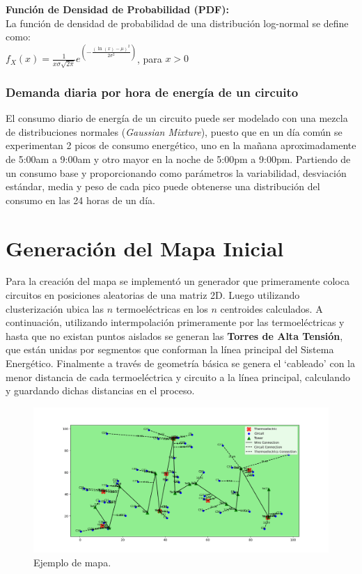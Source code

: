 \documentclass[twocolumn, fontsize=10pt]{article}
\begin{document}
\textbf{Función de Densidad de Probabilidad (PDF):}\\
La función de densidad de probabilidad de una distribución log-normal se define como:\\
$ f_X(x) = \frac{1}{x \sigma \sqrt{2 \pi}} e^{\left(-\frac{(\ln(x) - \mu)^2}{2 \sigma^2}\right)} $,  para $x > 0$

\subsubsection{Demanda diaria por hora de energía de un circuito}
El consumo diario de energía de un circuito puede ser modelado con una mezcla de distribuciones 
normales (\textit{Gaussian Mixture}), puesto que en un día común se experimentan 2 picos de consumo 
energético, uno en la mañana aproximadamente de 5:00am a 9:00am y otro mayor en la noche de 5:00pm 
a 9:00pm.
Partiendo de un consumo base y proporcionando como parámetros la variabilidad, desviación estándar, media y peso de cada pico puede obtenerse una distribución del consumo en las 24 horas de un día.\\


\section{Generación del Mapa Inicial}

Para la creación del mapa se implementó un generador que primeramente coloca circuitos en posiciones aleatorias 
de una matriz 2D. Luego utilizando clusterización ubica las $n$ termoeléctricas en los $n$ centroides calculados.
A continuación, utilizando intermpolación primeramente por las termoeléctricas y hasta que no existan puntos aislados se generan las 
\textbf{Torres de Alta Tensión}, que están unidas por segmentos que conforman la línea principal del Sistema Energético. 
Finalmente a través de geometría básica se genera el `cableado' con la menor distancia de cada termoeléctrica y circuito a la línea principal, calculando y guardando dichas distancias en el proceso.

\begin{figure}[h]
  \centering
  \includegraphics[width=\columnwidth]{assets/map_example.png}
  \caption{Ejemplo de mapa.}
  \label{fig:ejemplo}
\end{figure}
\end{document}
